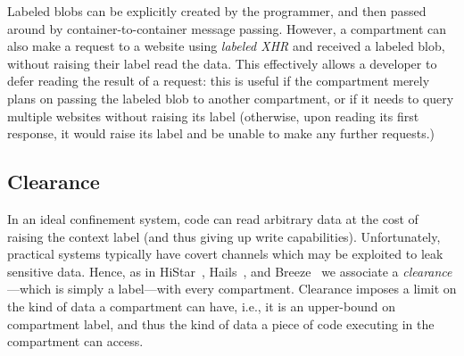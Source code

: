 Labeled blobs can be explicitly created by the programmer, and then
passed around by container-to-container message passing.
%
However, a compartment can also make a request to a website using
\emph{labeled XHR} and received a labeled blob, without raising their
label read the data.
%
This effectively allows a developer to defer reading the result of
a request: this is useful if the compartment merely plans on passing
the labeled blob to another compartment, or if it needs to query
multiple websites without raising its label (otherwise, upon reading
its first response, it would raise its label and be unable to
make any further requests.)



\subsection{Clearance}

In an ideal confinement system, code can read arbitrary data at the
cost of raising the context label (and thus giving up write
capabilities).
%
Unfortunately, practical systems typically have covert channels which
may be exploited to leak sensitive data.
%
Hence, as in HiStar~\cite{Zeldovich:2006}, Hails~\cite{giffin:2012:hails}, and
Breeze~\cite{Breeze13} we associate a \emph{clearance}---which is
simply a label---with every compartment.
%
Clearance imposes a limit on the kind of data a compartment can have,
i.e., it is an upper-bound on compartment label, and thus the kind of
data a piece of code executing in the compartment can access.




